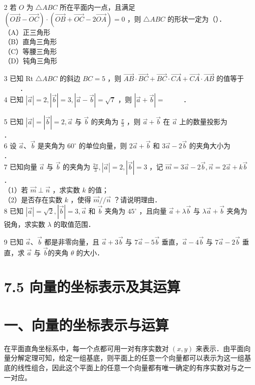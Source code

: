 \documentclass[10pt]{article}
\begin{document}
2 若 \(O\) 为 \(\triangle A B C\) 所在平面内一点，且满足 \((\overrightarrow{O B}-\overrightarrow{O C}) \cdot(\overrightarrow{O B}+\overrightarrow{O C}-2 \overrightarrow{O A})=0\) ，则 \(\triangle A B C\) 的形状一定为（）．\\
（A）正三角形\\
（B）直角三角形\\
（C）等腰三角形\\
（D）钝角三角形

3 已知 Rt \(\triangle A B C\) 的斜边 \(B C=5\) ，则 \(\overrightarrow{A B} \cdot \overrightarrow{B C}+\overrightarrow{B C} \cdot \overrightarrow{C A}+\overrightarrow{C A} \cdot \overrightarrow{A B}\) 的值等于\\
\(\qquad\) ．\\
4 已知 \(|\vec{a}|=2,|\vec{b}|=3,|\vec{a}-\vec{b}|=\sqrt{7}\) ，则 \(|\vec{a}+\vec{b}|=\) \(\qquad\) ．

5 已知 \(|\vec{a}|=|\vec{b}|=2, \vec{a}\) 与 \(\vec{b}\) 的夹角为 \(\frac{\pi}{3}\) ，则 \(\vec{a}+\vec{b}\) 在 \(\vec{a}\) 上的数量投影为 \(\qquad\) ．\\
6 设 \(\vec{a} 、 \vec{b}\) 是夹角为 \(60^{\circ}\) 的单位向量，则 \(2 \vec{a}+\vec{b}\) 和 \(3 \vec{a}-2 \vec{b}\) 的夹角大小为 \(\qquad\) ．\\
7 已知向量 \(\vec{a}\) 与 \(\vec{b}\) 的夹角为 \(\frac{2 \pi}{3},|\vec{a}|=2,|\vec{b}|=3\) ，记 \(\vec{m}=3 \vec{a}-2 \vec{b}, \vec{n}=2 \vec{a}+k \vec{b}\) ．\\
（1）若 \(\vec{m} \perp \vec{n}\) ，求实数 \(k\) 的值；\\
（2）是否存在实数 \(k\) ，使得 \(\vec{m} / / \vec{n}\) ？请说明理由．\\
8 已知 \(|\vec{a}|=\sqrt{2},|\vec{b}|=3, \vec{a}\) 和 \(\vec{b}\) 夹角为 \(45^{\circ}\) ，且向量 \(\vec{a}+\lambda \vec{b}\) 与 \(\lambda \vec{a}+\vec{b}\) 夹角为锐角，求实数 \(\lambda\) 的取值范围．

9 已知 \(\vec{a} 、 \vec{b}\) 都是非零向量，且 \(\vec{a}+3 \vec{b}\) 与 \(7 \vec{a}-5 \vec{b}\) 垂直，\(\vec{a}-4 \vec{b}\) 与 \(7 \vec{a}-2 \vec{b}\) 垂直，求 \(\vec{a}\) 与 \(\vec{b}\)的夹角 \(\theta\) 的大小．

\section*{7.5 向量的坐标表示及其运算}
\section*{一、向量的坐标表示与运算}
在平面直角坐标系中，每一个点都可用一对有序实数对 \((x, y)\) 来表示．由平面向量分解定理可知，给定一组基底，则平面上的任意一个向量都可以表示为这一组基底的线性组合，因此这个平面上的任意一个向量都有唯一确定的有序实数对与之一一对应。
\end{document}
